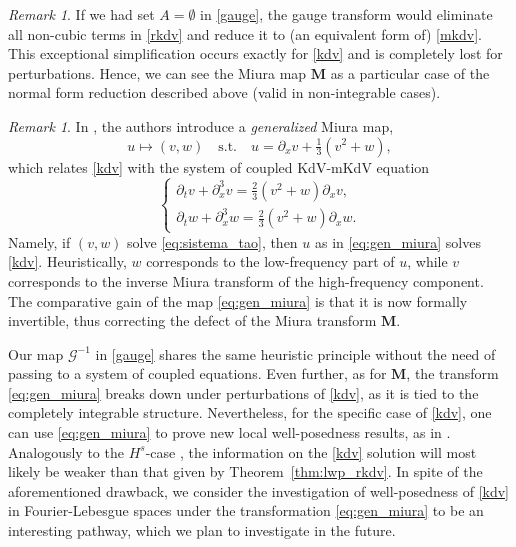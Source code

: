 \documentclass[a4paper,
11pt,  reqno]{amsart}
\newcommand{\5}{\textup{V}}
\newcommand{\noi}{\noindent}
\newcommand{\dx}{\partial_x}
\newcommand{\dt}{\partial_t}
\theoremstyle{remark}
\newtheorem{remark}[theorem]{Remark}
\newcommand{\MMb}{\mathbf{M}}
\newcommand{\Gc}{\mathcal{G}}
\numberwithin{equation}{section}
\numberwithin{theorem}{section}
\begin{document}
        \begin{remark}
If we had set $A=\emptyset$ in \eqref{gauge}, the gauge transform would eliminate all non-cubic terms in \eqref{rkdv} and reduce it to (an equivalent form of) \eqref{mkdv}. This exceptional simplification occurs exactly for \eqref{kdv} and is completely lost for perturbations.
Hence, we can see the Miura map $\MMb$ as a particular case of the normal form reduction described above (valid in non-integrable cases).


        \end{remark}

\begin{remark}
In \cite{CCT_ill}, the authors introduce a \emph{generalized} Miura map,
\begin{equation}\label{eq:gen_miura}
u\mapsto (v,w)\quad \mbox{s.t.}\quad u=\dx v + \tfrac13(v^2 + w),
\end{equation}
which relates \eqref{kdv} with the system of coupled KdV-mKdV equation
\begin{equation}\label{eq:sistema_tao}
\begin{cases}
\dt v + \dx^3 v = \tfrac23 (v^2 + w)\dx v, 
\\ 
\dt w + \dx^3 w = \tfrac23 (v^2 + w)\dx w
.
\end{cases}
\end{equation}
Namely, if $(v,w)$ solve \eqref{eq:sistema_tao}, then $u$ as in \eqref{eq:gen_miura} solves \eqref{kdv}.
Heuristically, $w$ corresponds to the low-frequency part of $u$, while $v$ corresponds to the inverse Miura transform of the high-frequency component. 
The comparative gain of the map \eqref{eq:gen_miura} is that it is now formally invertible, thus correcting the defect of the Miura transform $\MMb$.

\noi 
Our map $\Gc^{-1}$ in \eqref{gauge} shares the same heuristic principle without the need of passing to a system of coupled equations. Even further, as for $\MMb$, the transform \eqref{eq:gen_miura} breaks down under perturbations of \eqref{kdv}, as it is tied to the completely integrable structure.
Nevertheless, for the specific case of \eqref{kdv}, one can use \eqref{eq:gen_miura} to prove new local well-posedness results, as in \cite{CCT_ill}. Analogously to the $H^s$-case \cite{Guo_gwp, Kishimoto_lwp_crit}, the information on the \eqref{kdv} solution will most likely be weaker than that given by Theorem~\ref{thm:lwp_rkdv}.
In spite of the aforementioned drawback, we consider the investigation of well-posedness of \eqref{kdv} in Fourier-Lebesgue spaces under the transformation \eqref{eq:gen_miura} to be an interesting pathway, which we plan to investigate in the future.



\end{remark}
    
\end{document}
